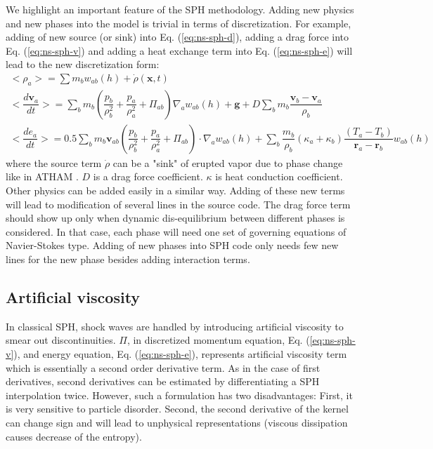 \documentclass[journal abbreviation, manuscript]{copernicus}
\begin{document}
We highlight an important feature of the SPH methodology. Adding new physics and new phases into the model is trivial in terms of discretization. For example, adding of new source (or sink) into Eq.  (\ref{eq:ns-sph-d}), adding a drag force into Eq. (\ref{eq:ns-sph-v})  and adding a heat exchange term into Eq. (\ref{eq:ns-sph-e}) will lead to the new discretization form:
\begin{align}
<\rho_a> = \sum m_b w_{ab} (h) + \dot{\rho}(\textbf{x},t)\label{eq:ns-source-sph-d} \\
<\dfrac{d \textbf{v}_a}{d t}>= \sum_b m_b (\dfrac{p_b}{\rho_b^2} + \dfrac{p_a}{\rho_a^2} + \Pi_{ab}) \nabla_a w_{a b}(h) +\textbf{g} + D \sum	_b m_b \dfrac{\textbf{v}_b - \textbf{v}_a}{\rho_b} \label{eq:ns-drag-sph-v} \\
<\dfrac{d e_a}{d t}>=
 0.5\sum_b m_b \textbf{v}_{a b}(\dfrac{p_b}{\rho_b^2} + \dfrac{p_a}{\rho_a^2} + \Pi_{ab}) \cdot \nabla_a w_{a b}(h) + \sum_b \dfrac{m_b}{\rho_b}(\kappa_a + \kappa_b) \dfrac{(T_a - T_b)}{\textbf{r}_a - \textbf{r}_b} w_{ab}(h) \label{eq:ns-conduction-sph-e}
\end{align}
where the source term $\dot{\rho}$ can be a "sink" of erupted vapor due to phase change like in ATHAM \citep{oberhuber1998volcanic}. $D$ is a drag force coefficient. $\kappa$ is heat conduction coefficient. Other physics can be added easily in a similar way. Adding of these new terms will lead to modification of several lines in the source code. The drag force term should show up only when dynamic dis-equilibrium between different phases is considered. In that case, each phase will need one set of governing equations of Navier-Stokes type. Adding of new phases into SPH code only needs few new lines for the new phase besides adding  interaction terms.

\subsection{Artificial viscosity} \label{sec:artificial-viscosity}
In classical SPH, shock waves are handled by introducing artificial viscosity to smear out discontinuities. $\Pi$, in discretized momentum equation, Eq. (\ref{eq:ns-sph-v}), and energy equation, Eq. (\ref{eq:ns-sph-e}), represents artificial viscosity term which is essentially a second order derivative term. As in the case of first derivatives, second derivatives can be estimated by differentiating a SPH interpolation twice. However, such a formulation has two disadvantages: First, it is very sensitive to particle disorder. Second, the second derivative of the kernel can change sign and will lead to unphysical representations (viscous dissipation causes decrease of the entropy). 
\end{document}
